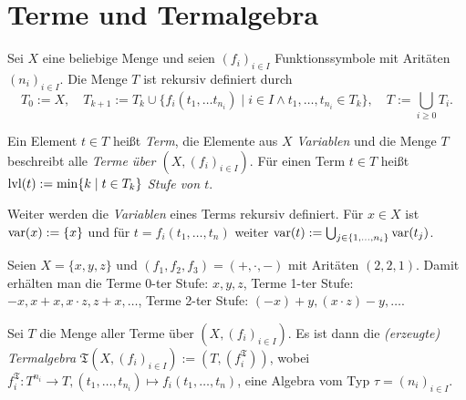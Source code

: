 \section{Terme und Termalgebra}

\begin{definition}
    Sei $X$ eine beliebige Menge und seien $(f_i)_{i \in I}$ Funktionssymbole mit Aritäten $(n_i)_{i \in I}$. Die Menge $T$ ist rekursiv definiert durch $$T_0 := X ,\quad T_{k+1} := T_k \cup \{f_i(t_1, \ldots t_{n_i}) \;\vert\; i \in I \land t_1, \ldots, t_{n_i} \in T_k\},\quad T := \bigcup_{i \ge 0} T_i.$$ 
    
    Ein Element $t \in T$ heißt \emph{Term}, die Elemente aus $X$ \emph{Variablen} und die Menge $T$ beschreibt alle \emph{Terme über $(X, (f_i)_{i \in I})$}.
    Für einen Term $t \in T$ heißt $\operatorname{lvl}(t) := \min\{k \;\vert\; t \in T_k\}$ \emph{Stufe von $t$}. 
    
    Weiter werden die \emph{Variablen} eines Terms rekursiv definiert. Für $x \in X$ ist $\operatorname{var}(x) := \{x\}$ und für $t = f_i(t_1, \ldots, t_n)$ weiter $\operatorname{var}(t) := \bigcup_{j \in \{1, \ldots, n_i\}} \operatorname{var}(t_j)$.
\end{definition}

\begin{example}
    Seien $X = \{x,y,z\}$ und $(f_1, f_2, f_3) = (+, \cdot, -)$ mit Aritäten $(2,2,1)$. Damit erhälten man die Terme 0-ter Stufe: $x, y, z$, Terme 1-ter Stufe: $-x, x+x, x\cdot z, z + x, \ldots$, Terme 2-ter Stufe: $(-x) + y, (x \cdot z) - y, \ldots$.
\end{example}

\begin{definition}
    Sei $T$ die Menge aller Terme über $(X, (f_i)_{i \in I})$. Es ist dann die \emph{(erzeugte) Termalgebra} $\mathfrak{T}(X, (f_i)_{i \in I}) := (T, (f_i^\mathfrak{T}))$, wobei $f_i^\mathfrak{T}: T^{n_i} \to T, (t_1, \ldots, t_{n_i}) \mapsto f_i(t_1, \ldots, t_n)$, eine Algebra vom Typ $\tau = (n_i)_{i \in I}$.
\end{definition}

